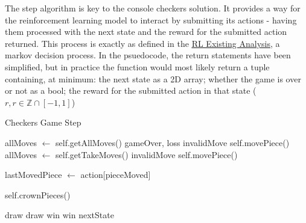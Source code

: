 \documentclass{article}
\newcommand{\myhy}[2]{\hyperref[#1]{\color{black}\setulcolor{black}\ul{#2}}}
\begin{document}
    \pagebreak
    \vspace*{17.5mm}
    The step algorithm is key to the console checkers solution. It provides a way for the reinforcement learning model to interact by submitting its actions - 
    having them processed with the next state and the reward for the submitted action returned. This process is exactly as defined in the \myhy{analysis section}{RL Existing Analysis}, a markov decision process.
    In the psuedocode, the return statements have been simplified, but in practice the function would most likely return a tuple containing, at minimum: the next state as a 2D array;
    whether the game is over or not as a bool; the reward for the submitted action in that state ($r, r \in \mathbb{Z} \cap [-1, 1]$)
    \vspace{5mm}

    \begin{algorithm} 
        \caption{Checkers Game Step}
        \begin{algorithmic}
            \State allMoves $\gets$ self.getAllMoves()
                \State \Return gameOver, loss
            \EndIf
                \State \Return invalidMove
            \Else
                \State self.movePiece()
            \EndIf
            \State allMoves $\gets$ self.getTakeMoves()
                \State \Return invalidMove
            \Else
                \State self.movePiece()
            \EndIf
        \EndIf

                \State lastMovedPiece $\gets$ action[pieceMoved]
            \EndIf
        \EndIf

        \State self.crownPieces()
        
            \State \Return draw
            \State \Return draw
            \State \Return win
            \State \Return win
        \Else
            \State \Return nextState
        \EndIf

        \EndFunction
        \end{algorithmic}
    \end{algorithm}
\end{document}
